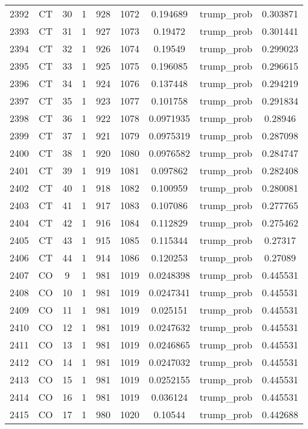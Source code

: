 \documentclass[12pt,a4paper]{article}
\begin{document}
\begin{tabular}{r|cccccccc}
	2392 & CT & 30 & 1 & 928 & 1072 & 0.194689 & trump\_prob & 0.303871 \\
	2393 & CT & 31 & 1 & 927 & 1073 & 0.19472 & trump\_prob & 0.301441 \\
	2394 & CT & 32 & 1 & 926 & 1074 & 0.19549 & trump\_prob & 0.299023 \\
	2395 & CT & 33 & 1 & 925 & 1075 & 0.196085 & trump\_prob & 0.296615 \\
	2396 & CT & 34 & 1 & 924 & 1076 & 0.137448 & trump\_prob & 0.294219 \\
	2397 & CT & 35 & 1 & 923 & 1077 & 0.101758 & trump\_prob & 0.291834 \\
	2398 & CT & 36 & 1 & 922 & 1078 & 0.0971935 & trump\_prob & 0.28946 \\
	2399 & CT & 37 & 1 & 921 & 1079 & 0.0975319 & trump\_prob & 0.287098 \\
	2400 & CT & 38 & 1 & 920 & 1080 & 0.0976582 & trump\_prob & 0.284747 \\
	2401 & CT & 39 & 1 & 919 & 1081 & 0.097862 & trump\_prob & 0.282408 \\
	2402 & CT & 40 & 1 & 918 & 1082 & 0.100959 & trump\_prob & 0.280081 \\
	2403 & CT & 41 & 1 & 917 & 1083 & 0.107086 & trump\_prob & 0.277765 \\
	2404 & CT & 42 & 1 & 916 & 1084 & 0.112829 & trump\_prob & 0.275462 \\
	2405 & CT & 43 & 1 & 915 & 1085 & 0.115344 & trump\_prob & 0.27317 \\
	2406 & CT & 44 & 1 & 914 & 1086 & 0.120253 & trump\_prob & 0.27089 \\
	2407 & CO & 9 & 1 & 981 & 1019 & 0.0248398 & trump\_prob & 0.445531 \\
	2408 & CO & 10 & 1 & 981 & 1019 & 0.0247341 & trump\_prob & 0.445531 \\
	2409 & CO & 11 & 1 & 981 & 1019 & 0.025151 & trump\_prob & 0.445531 \\
	2410 & CO & 12 & 1 & 981 & 1019 & 0.0247632 & trump\_prob & 0.445531 \\
	2411 & CO & 13 & 1 & 981 & 1019 & 0.0246865 & trump\_prob & 0.445531 \\
	2412 & CO & 14 & 1 & 981 & 1019 & 0.0247032 & trump\_prob & 0.445531 \\
	2413 & CO & 15 & 1 & 981 & 1019 & 0.0252155 & trump\_prob & 0.445531 \\
	2414 & CO & 16 & 1 & 981 & 1019 & 0.036124 & trump\_prob & 0.445531 \\
	2415 & CO & 17 & 1 & 980 & 1020 & 0.10544 & trump\_prob & 0.442688 \\

\end{tabular}
\end{document}
